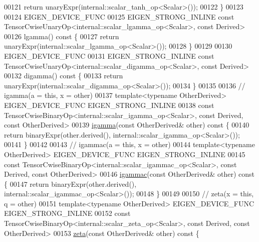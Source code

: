 \begin{DoxyCode}
00121       \textcolor{keywordflow}{return} unaryExpr(internal::scalar\_tanh\_op<Scalar>());
00122     \}
00123 
00124     EIGEN\_DEVICE\_FUNC
00125     EIGEN\_STRONG\_INLINE \textcolor{keyword}{const} TensorCwiseUnaryOp<internal::scalar\_lgamma\_op<Scalar>, \textcolor{keyword}{const} Derived>
00126     lgamma()\textcolor{keyword}{ const }\{
00127       \textcolor{keywordflow}{return} unaryExpr(internal::scalar\_lgamma\_op<Scalar>());
00128     \}
00129 
00130     EIGEN\_DEVICE\_FUNC
00131     EIGEN\_STRONG\_INLINE \textcolor{keyword}{const} TensorCwiseUnaryOp<internal::scalar\_digamma\_op<Scalar>, \textcolor{keyword}{const} Derived>
00132     digamma()\textcolor{keyword}{ const }\{
00133       \textcolor{keywordflow}{return} unaryExpr(internal::scalar\_digamma\_op<Scalar>());
00134     \}
00135 
00136     \textcolor{comment}{// igamma(a = this, x = other)}
00137     \textcolor{keyword}{template}<\textcolor{keyword}{typename} OtherDerived> EIGEN\_DEVICE\_FUNC EIGEN\_STRONG\_INLINE
00138     \textcolor{keyword}{const} TensorCwiseBinaryOp<internal::scalar\_igamma\_op<Scalar>, \textcolor{keyword}{const} Derived, \textcolor{keyword}{const} OtherDerived>
00139     \hyperlink{namespace_eigen_af5aa651137636b1cdbd27de1cfe91148}{igamma}(\textcolor{keyword}{const} OtherDerived& other)\textcolor{keyword}{ const }\{
00140       \textcolor{keywordflow}{return} binaryExpr(other.derived(), internal::scalar\_igamma\_op<Scalar>());
00141     \}
00142 
00143     \textcolor{comment}{// igammac(a = this, x = other)}
00144     \textcolor{keyword}{template}<\textcolor{keyword}{typename} OtherDerived> EIGEN\_DEVICE\_FUNC EIGEN\_STRONG\_INLINE
00145     \textcolor{keyword}{const} TensorCwiseBinaryOp<internal::scalar\_igammac\_op<Scalar>, \textcolor{keyword}{const} Derived, \textcolor{keyword}{const} OtherDerived>
00146     \hyperlink{namespace_eigen_a1abaa2ff8c7b1871eaf026a47c6bbf3b}{igammac}(\textcolor{keyword}{const} OtherDerived& other)\textcolor{keyword}{ const }\{
00147       \textcolor{keywordflow}{return} binaryExpr(other.derived(), internal::scalar\_igammac\_op<Scalar>());
00148     \}
00149 
00150     \textcolor{comment}{// zeta(x = this, q = other)}
00151     \textcolor{keyword}{template}<\textcolor{keyword}{typename} OtherDerived> EIGEN\_DEVICE\_FUNC EIGEN\_STRONG\_INLINE
00152     \textcolor{keyword}{const} TensorCwiseBinaryOp<internal::scalar\_zeta\_op<Scalar>, \textcolor{keyword}{const} Derived, \textcolor{keyword}{const} OtherDerived>
00153     \hyperlink{namespace_eigen_af9555e27540da78d2c4bdd17d3b750b1}{zeta}(\textcolor{keyword}{const} OtherDerived& other)\textcolor{keyword}{ const }\{

\end{DoxyCode}
